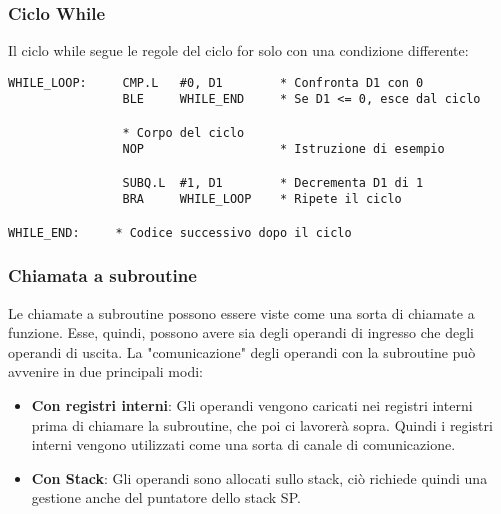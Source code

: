 \subsubsection{Ciclo While}

Il ciclo while segue le regole del ciclo for solo con una condizione differente:
\begin{lstlisting}
WHILE_LOOP:     CMP.L   #0, D1        * Confronta D1 con 0
                BLE     WHILE_END     * Se D1 <= 0, esce dal ciclo

                * Corpo del ciclo
                NOP                   * Istruzione di esempio

                SUBQ.L  #1, D1        * Decrementa D1 di 1
                BRA     WHILE_LOOP    * Ripete il ciclo

WHILE_END:     * Codice successivo dopo il ciclo
\end{lstlisting}


\subsubsection{Chiamata a subroutine}

Le chiamate a subroutine possono essere viste come una sorta di chiamate a funzione. Esse, quindi, possono avere sia degli operandi di ingresso che degli operandi di uscita. La "comunicazione" degli operandi con la subroutine può avvenire in due principali modi:
\begin{itemize}
    \item \textbf{Con registri interni}: Gli operandi vengono caricati nei registri interni prima di chiamare la subroutine, che poi ci lavorerà sopra. Quindi i registri interni vengono utilizzati come una sorta di canale di comunicazione.
    \item \textbf{Con Stack}: Gli operandi sono allocati sullo stack, ciò richiede quindi una gestione anche del puntatore dello stack SP.
\end{itemize}

